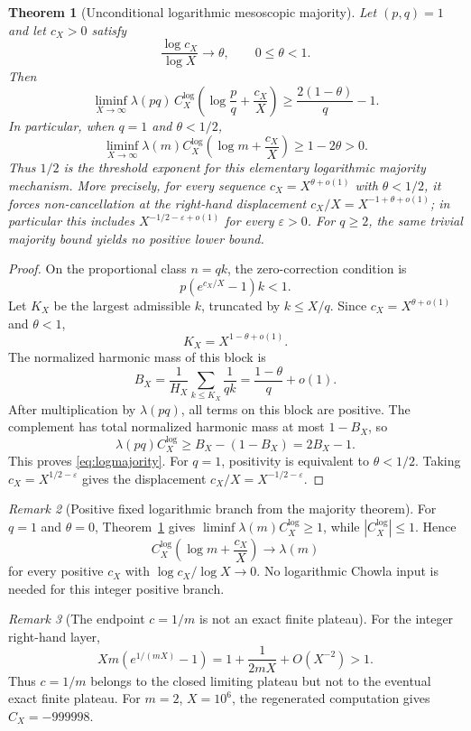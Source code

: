 \documentclass[preprint,12pt]{elsarticle}
\numberwithin{equation}{section}
\theoremstyle{plain}
\newtheorem{theorem}{Theorem}[section]
\theoremstyle{definition}
\theoremstyle{remark}
\newtheorem{remark}[theorem]{Remark}
\begin{document}
\begin{theorem}[Unconditional logarithmic mesoscopic majority]
\label{thm:logmajority}
Let $(p,q)=1$ and let $c_X>0$ satisfy
\[
\frac{\log c_X}{\log X}\longrightarrow\theta,
\qquad 0\le\theta<1.
\]
Then
\begin{equation}
\liminf_{X\to\infty}
\lambda(pq)\,
C_X^{\log}\!\left(\log\frac pq+\frac{c_X}{X}\right)
\ge
\frac{2(1-\theta)}q-1.
\label{eq:logmajority}
\end{equation}
In particular, when $q=1$ and $\theta<1/2$,
\[
\liminf_{X\to\infty}
\lambda(m)C_X^{\log}\!\left(\log m+\frac{c_X}{X}\right)
\ge1-2\theta>0.
\]
Thus $1/2$ is the threshold exponent for this elementary logarithmic
majority mechanism. More precisely, for every sequence
$c_X=X^{\theta+o(1)}$ with $\theta<1/2$, it forces non-cancellation at the
right-hand displacement $c_X/X=X^{-1+\theta+o(1)}$; in particular this
includes $X^{-1/2-\varepsilon+o(1)}$ for every $\varepsilon>0$.
For $q\ge2$, the same trivial majority bound yields no positive lower bound.
\end{theorem}

\begin{proof}
On the proportional class $n=qk$, the zero-correction condition is
\[
p(e^{c_X/X}-1)k<1.
\]
Let $K_X$ be the largest admissible $k$, truncated by $k\le X/q$. Since
$c_X=X^{\theta+o(1)}$ and $\theta<1$,
\[
K_X=X^{1-\theta+o(1)}.
\]
The normalized harmonic mass of this block is
\[
B_X=
\frac1{H_X}\sum_{k\le K_X}\frac1{qk}
=
\frac{1-\theta}{q}+o(1).
\]
After multiplication by $\lambda(pq)$, all terms on this block are positive.
The complement has total normalized harmonic mass at most $1-B_X$, so
\[
\lambda(pq)C_X^{\log}\ge B_X-(1-B_X)=2B_X-1.
\]
This proves \eqref{eq:logmajority}. For $q=1$, positivity is equivalent to
$\theta<1/2$. Taking $c_X=X^{1/2-\varepsilon}$ gives the displacement
$c_X/X=X^{-1/2-\varepsilon}$.
\end{proof}

\begin{remark}[Positive fixed logarithmic branch from the majority theorem]
For $q=1$ and $\theta=0$, Theorem~\ref{thm:logmajority} gives
$\liminf\lambda(m)C_X^{\log}\ge1$, while $|C_X^{\log}|\le1$. Hence
\[
C_X^{\log}\!\left(\log m+\frac{c_X}{X}\right)\to\lambda(m)
\]
for every positive $c_X$ with $\log c_X/\log X\to0$. No logarithmic Chowla
input is needed for this integer positive branch.
\end{remark}

\begin{remark}[The endpoint $c=1/m$ is not an exact finite plateau]
For the integer right-hand layer,
\[
Xm(e^{1/(mX)}-1)
=
1+\frac1{2mX}+O(X^{-2})>1.
\]
Thus $c=1/m$ belongs to the closed limiting plateau but not to the eventual
exact finite plateau. For $m=2$, $X=10^6$, the regenerated computation gives
$C_X=-999998$.
\end{remark}
\end{document}
